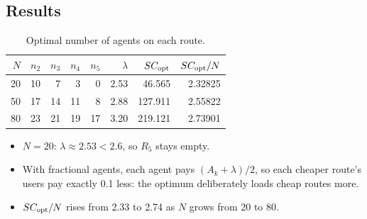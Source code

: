 \documentclass[11pt]{article}
\begin{document}
\subsection{Results}

\begin{table}[H]
\centering
\begin{tabular}{@{}rrrrrrrr@{}}
\toprule
$N$ & $n_2$ & $n_3$ & $n_4$ & $n_5$ & $\lambda$ & $SC_{\mathrm{opt}}$ & $SC_{\mathrm{opt}}/N$ \\
\midrule
20 & 10 & 7  & 3  & 0  & 2.53 & 46.565  & 2.32825 \\
50 & 17 & 14 & 11 & 8  & 2.88 & 127.911 & 2.55822 \\
80 & 23 & 21 & 19 & 17 & 3.20 & 219.121 & 2.73901 \\
\bottomrule
\end{tabular}
\caption{Optimal number of agents on each route.}
\end{table}

\begin{itemize}
  \item $N = 20$: $\lambda \approx 2.53 < 2.6$, so $R_5$ stays empty.
  \item With fractional agents, each agent pays $(A_k + \lambda)/2$, so each cheaper route's users pay
        exactly 0.1 less: the optimum deliberately loads cheap routes more.
  \item $SC_{\mathrm{opt}}/N$ rises from 2.33 to 2.74 as $N$ grows from 20 to 80.
\end{itemize}
\end{document}
